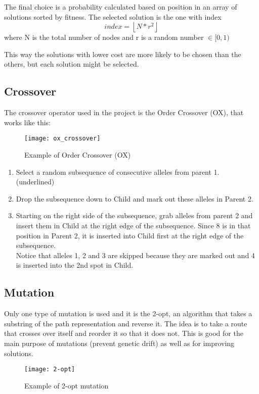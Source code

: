 		The final choice is a probability calculated based on position in an array of solutions sorted by fitness. The selected solution is the one with index
		\[index = \left \lfloor{N * r^{2}}\right \rfloor\]
		where N is the total number of nodes and r is a random number $\in [0, 1)$
		
		This way the solutions with lower cost are more likely to be chosen than the others, but each solution might be selected.
		
	\subsection{Crossover}
		The crossover operator used in the project is the Order Crossover (OX), that works like this:
		
		\begin{figure}[h]
		\texttt{[image: ox\_crossover]}
		\centering
		\caption{Example of Order Crossover (OX)}
		\end{figure}
		
		\begin{enumerate}
			\item Select a random subsequence of consecutive alleles from parent 1. (underlined)
			\item Drop the subsequence down to Child and mark out these alleles in Parent 2.
			\item Starting on the right side of the subsequence, grab alleles from parent 2 and insert them in Child at the right edge of the subsequence. Since 8 is in that position in Parent 2, it is inserted into Child first at the right edge of the subsequence.\\
				Notice that alleles 1, 2 and 3 are skipped because they are marked out and 4 is inserted into the 2nd spot in Child.
		\end{enumerate}
		
	\subsection{Mutation}
		Only one type of mutation is used and it is the 2-opt, an algorithm that takes a substring of the path representation and reverse it. The idea is to take a route that crosses over itself and reorder it so that it does not.
		This is good for the main purpose of mutations (prevent genetic drift) as well as for improving solutions.
		
		\begin{figure}[h]
		\texttt{[image: 2-opt]}
		\centering
		\caption{Example of 2-opt mutation}
		\end{figure}
		
